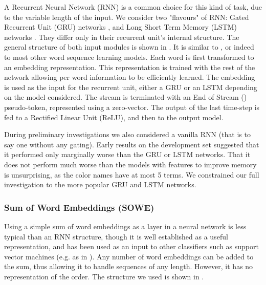 A Recurrent Neural Network (RNN) is a common choice for this kind of task,
due to the variable length of the input.
We consider two "flavours" of RNN:  Gated Recurrent Unit (GRU) networks \parencite{cho2014properties}, and  Long Short Term Memory (LSTM) networks \parencite{hochreiter1997long,gers1999learning}.
They differ only in their recurrent unit's internal structure.
The general structure of both input modules is  shown in .
It is similar to \textcite{2016arXiv160603821M}, or indeed to most other word sequence learning models.
Each word is first transformed to an embedding representation.
This representation is trained with the rest of the network allowing per word information to be efficiently learned.
The embedding is used as the input for the recurrent unit, either a GRU or an LSTM depending on the model considered.
The stream is terminated with an End of Stream () pseudo-token,
represented using a zero-vector.
The output of the last time-step is fed to a Rectified Linear Unit (ReLU), and then to the output model.

During preliminary investigations we also considered a vanilla RNN (that is to say one without any gating). Early results on the development set suggested that it performed only marginally worse than the GRU or LSTM networks.
That it does not perform much worse than the models with features to improve memory is unsurprising, as the color names have at most 5 terms.
We constrained our full investigation to the more popular GRU and LSTM networks.

\subsubsection{Sum of Word Embeddings (SOWE)}\label{sec:sowemod}
Using a simple sum of word embeddings as a layer in a neural network is less typical than an RNN structure,
though it is well established as a useful representation, and has been used as an input to other classifiers such as support vector machines (e.g. as in \textcite{White2015SentVecMeaning,novelperspective}).
Any number of word embeddings can be added to the sum, thus allowing it to handle sequences of any length.
However, it has no representation of the order.
The structure we used is shown in .

